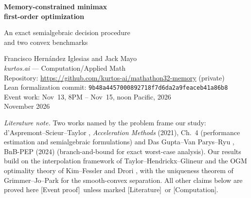 \documentclass[11pt]{article}
\newcommand{\supportlabel}[1]{\textcolor{blue!60!black}{\small\textsf{[#1]}}}
\newcommand{\eventproof}{\supportlabel{Event proof}}
\newcommand{\literature}{\supportlabel{Literature}}
\newcommand{\computation}{\supportlabel{Computation}}
\numberwithin{equation}{section}
\theoremstyle{definition}
\begin{document}
\begin{center}
{\LARGE\bfseries Memory-constrained minimax\\[3pt] first-order optimization\par}
\vspace{0.65em}
{\large An exact semialgebraic decision procedure\\
and two convex benchmarks\par}
\vspace{0.7em}
Francisco Hern\'andez Iglesias and Jack Mayo\\[2pt]
{\small \textit{kurtos.ai} --- Computation/Applied Math}\\[4pt]
{\small Repository: \url{https://github.com/kurtos-ai/mathathon32-memory} (private)}\\[2pt]
{\small Lean formalization commit: \texttt{9b48a4457000892718f7d6da2a9feaceb41a86b8}}\\[2pt]
{\small Event work: Nov~13, 8PM -- Nov~15, noon Pacific, 2026}\\[2pt]
November 2026
\end{center}
\thispagestyle{plain}
\begin{abstract}
We consider deterministic first-order methods with predetermined scalar coefficients, a prescribed finite number of exact gradient queries, and a bounded number of persistent vector registers. We prove an exact characterization of memory by ranks of past-to-future coefficient blocks. Under an effective finite semialgebraic description of attainable losses, we prove that projecting the performance condition, imposing the memory equations, and deciding their intersection computes the minimax values and all strict memory gains. Every finite value is a computable real algebraic number. We extend the rank formula and decision procedure to subgradient methods with a projection after every increment, under an explicitly specified register model. For convex quadratics, we calculate the exact value and show that one vector register suffices for every horizon. For convex smooth functions, we give the finite interpolation formula, recover the optimal two-register guarantee, and determine the strict first-register separation using a cited uniqueness theorem and a compactness argument.
\end{abstract}

\noindent\textit{Literature note.} Two works named by the problem frame our study:
d'Aspremont--Scieur--Taylor \cite{AST}, \emph{Acceleration Methods} (2021), Ch.~4 (performance estimation and semialgebraic formulations) and
Das Gupta--Van Parys--Ryu \cite{BnBPEP}, BnB-PEP (2024) (branch-and-bound for exact worst-case analysis).
Our results build on the interpolation framework of Taylor--Hendrickx--Glineur \cite{THG}
and the OGM optimality theory of Kim--Fessler \cite{KF} and Drori \cite{Drori},
with the uniqueness theorem of Grimmer--Jo--Park \cite{GJP} for the smooth-convex separation.
All other claims below are proved here \eventproof\ unless marked \literature\ or \computation.
\end{document}
